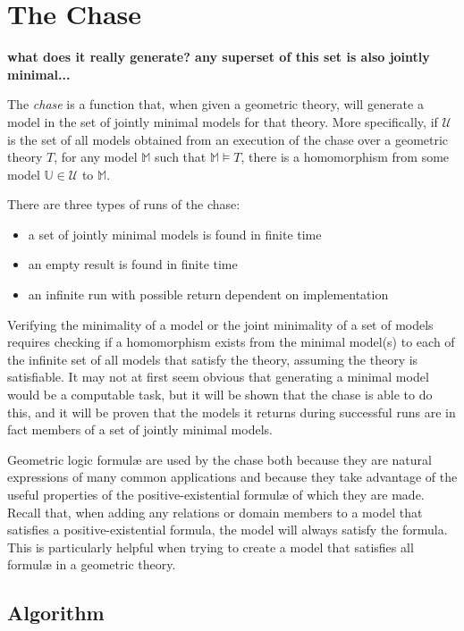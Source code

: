 \section{The Chase}

	\textbf{ what does it really generate? any superset of this set is also jointly minimal... }

	The \emph{chase} is a function that, when given a geometric theory, will
	generate a model in the set of jointly minimal models for that theory. More
	specifically, if $\mathcal{U}$ is the set of all models obtained from an
	execution of the chase over a geometric theory $T$, for any model
	$\mathbb{M}$ such that $\mathbb{M} \models T$, there is a homomorphism from
	some model $\mathbb{U} \in \mathcal{U}$ to $\mathbb{M}$.

	There are three types of runs of the chase:
	\begin{itemize}
	\item a set of jointly minimal models is found in finite time
	\item an empty result is found in finite time
	\item an infinite run with possible return dependent on implementation
	\end{itemize}

	Verifying the minimality of a model or the joint minimality of a set of
	models requires checking if a homomorphism exists from the minimal model(s)
	to each of the infinite set of all models that satisfy the theory, assuming
	the theory is satisfiable. It may not at first seem obvious that generating
	a minimal model would be a computable task, but it will be shown that the
	chase is able to do this, and it will be proven that the models it returns
	during successful runs are in fact members of a set of jointly minimal
	models.

	Geometric logic formul{\ae} are used by the chase both because they are
	natural expressions of many common applications and because they take
	advantage of the useful properties of the positive-existential formul{\ae}
	of which they are made.  Recall that, when adding any relations or domain
	members to a model that satisfies a positive-existential formula, the model
	will always satisfy the formula. This is particularly helpful when trying
	to create a model that satisfies all formul{\ae} in a geometric theory.

	\subsection{Algorithm}
	\label{sec:chase.algorithm}

